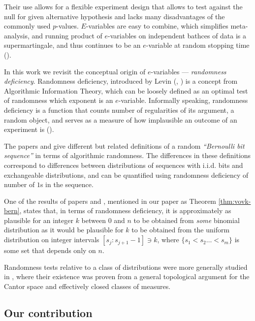 \documentclass{article}
\theoremstyle{definition}
\theoremstyle{definition}
\begin{document}
Their use allows for a flexible experiment design that allows to test against the null for given alternative hypothesis and lacks many disadvantages of the commonly used $p$-values. $E$-variables are easy to combine, which simplifies meta-analysis, and running product of $e$-variables on independent bathces of data is a supermartingale, and thus continues to be an $e$-variable at random stopping time (\cite{VovkWang2021Calibration, GrunwaldSafeTesting}).

In this work we revisit the conceptual origin of $e$-variables --- \emph{randomness deficiency}. Randomness deficiency, introduced by Levin (\cite{levin1976uniform}, \cite{LEVIN198415}) is a concept from Algorithmic Information Theory, which can be loosely defined as an optimal test of randomness which exponent is an $e$-variable. Informally speaking, randomness deficiency is a function that counts number of regularities of its argument, a random object, and serves as a measure of how implausible an outcome of an experiment is (\cite{shen}).

The papers \cite{Kolmogorov1968LogicalBF} and \cite{vovk2016concept} give different but related definitions of a random \textit{``Bernoulli bit sequence'' }in terms of algorithmic randomness. The differences in these definitions correspond to differences between distributions of sequences with i.i.d. bits and exchangeable distributions, and can be quantified using randomness deficiency of number of $1$s in the sequence. 

One of the results of papers \cite{vovk2016concept} and \cite{VovkLearningBernoulli199796}, mentioned in our paper as Theorem \ref{thm:vovk-bern}, states that, in terms of randomness deficiency, it is approximately as plausible for an integer $k$ between $0$ and $n$ to be obtained from \emph{some} binomial distribution as it would be plausible for $k$ to be obtained from the uniform distribution on integer intervals $[s_j:s_{j+1}-1]\ni k$, where $\{s_1 < s_2 \ldots < s_m\}$ is some set that depends only on $n$.

Randomness tests relative to a class of distributions were more generally studied in \cite{Bienvenu2011AlgorithmicTA}, where their existence was proven from a general topological argument for the Cantor space and effectively closed classes of measures.


\subsection{Our contribution}
\end{document}
